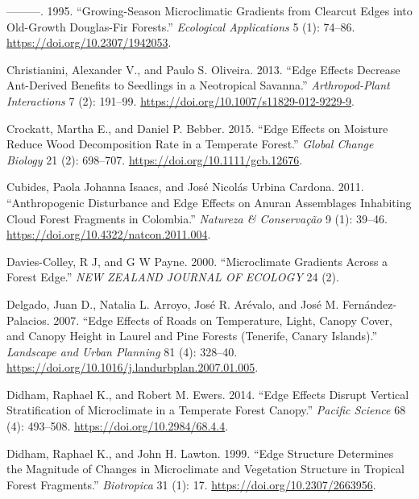 \documentclass[
  12pt,
]{article}
\newlength{\cslhangindent}
\newenvironment{CSLReferences}[2] %
 {\begin{list}{}{%
  \setlength{\itemindent}{0pt}
  \setlength{\leftmargin}{0pt}
  \setlength{\parsep}{0pt}
  \ifodd #1
   \setlength{\leftmargin}{\cslhangindent}
   \setlength{\itemindent}{-1\cslhangindent}
  \fi
  \setlength{\itemsep}{#2\baselineskip}}}
 {\end{list}}
\begin{document}
\begin{CSLReferences}{1}{0}
---------. 1995. {``Growing-{Season} {Microclimatic} {Gradients} from
{Clearcut} {Edges} into {Old}-{Growth} {Douglas}-{Fir} {Forests}.''}
\emph{Ecological Applications} 5 (1): 74--86.
\url{https://doi.org/10.2307/1942053}.

Christianini, Alexander V., and Paulo S. Oliveira. 2013. {``Edge Effects
Decrease Ant-Derived Benefits to Seedlings in a Neotropical Savanna.''}
\emph{Arthropod-Plant Interactions} 7 (2): 191--99.
\url{https://doi.org/10.1007/s11829-012-9229-9}.

Crockatt, Martha E., and Daniel P. Bebber. 2015. {``Edge Effects on
Moisture Reduce Wood Decomposition Rate in a Temperate Forest.''}
\emph{Global Change Biology} 21 (2): 698--707.
\url{https://doi.org/10.1111/gcb.12676}.

Cubides, Paola Johanna Isaacs, and José Nicolás Urbina Cardona. 2011.
{``Anthropogenic {Disturbance} and {Edge} {Effects} on {Anuran}
{Assemblages} {Inhabiting} {Cloud} {Forest} {Fragments} in
{Colombia}.''} \emph{Natureza \& Conservação} 9 (1): 39--46.
\url{https://doi.org/10.4322/natcon.2011.004}.

Davies-Colley, R J, and G W Payne. 2000. {``Microclimate Gradients
Across a Forest Edge.''} \emph{NEW ZEALAND JOURNAL OF ECOLOGY} 24 (2).

Delgado, Juan D., Natalia L. Arroyo, José R. Arévalo, and José M.
Fernández-Palacios. 2007. {``Edge Effects of Roads on Temperature,
Light, Canopy Cover, and Canopy Height in Laurel and Pine Forests
({Tenerife}, {Canary} {Islands}).''} \emph{Landscape and Urban Planning}
81 (4): 328--40.
\url{https://doi.org/10.1016/j.landurbplan.2007.01.005}.

Didham, Raphael K., and Robert M. Ewers. 2014. {``Edge {Effects}
{Disrupt} {Vertical} {Stratification} of {Microclimate} in a {Temperate}
{Forest} {Canopy}.''} \emph{Pacific Science} 68 (4): 493--508.
\url{https://doi.org/10.2984/68.4.4}.

Didham, Raphael K., and John H. Lawton. 1999. {``Edge {Structure}
{Determines} the {Magnitude} of {Changes} in {Microclimate} and
{Vegetation} {Structure} in {Tropical} {Forest} {Fragments}.''}
\emph{Biotropica} 31 (1): 17. \url{https://doi.org/10.2307/2663956}.


\end{CSLReferences}
\end{document}
